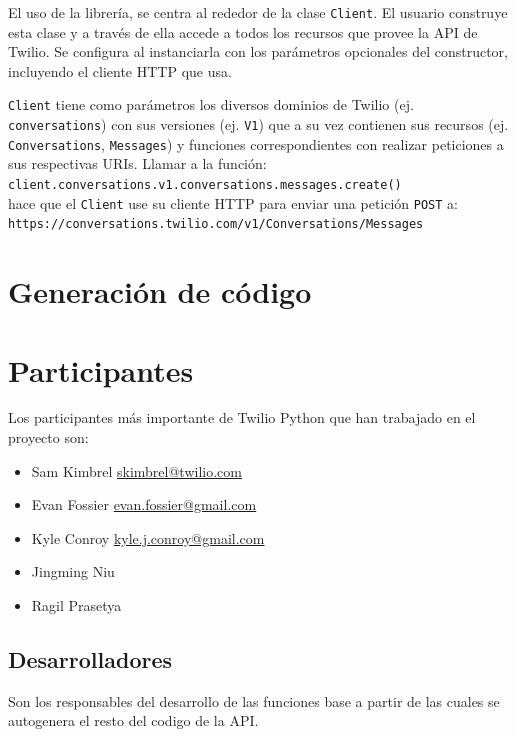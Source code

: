 \documentclass{article}
\begin{document}
\hfill

El uso de la librería, se centra al rededor de la clase \verb|Client|.
El usuario construye esta clase
y a través de ella accede a todos los recursos que provee la API de Twilio.
Se configura al instanciarla con los parámetros opcionales del constructor,
incluyendo el cliente HTTP que usa.

\verb|Client| tiene como parámetros los diversos dominios de Twilio
(ej. \verb|conversations|)
con sus versiones (ej. \verb|V1|)
que a su vez contienen sus recursos
(ej. \verb|Conversations|, \verb|Messages|)
y funciones correspondientes con realizar peticiones
a sus respectivas URIs.
Llamar a la función:
\\ \hspace*{1em} \verb|client.conversations.v1.conversations.messages.create()|
\\hace que el \verb|Client|
use su cliente HTTP para enviar una petición \verb|POST| a:
\\ \hspace*{1em} \verb|https://conversations.twilio.com/v1/Conversations/Messages|

\section{Generación de código}



\section{Participantes}
Los participantes más importante de Twilio Python que han trabajado en el proyecto son:
\begin{itemize}
  \item Sam Kimbrel \href{mailto:skimbrel@twilio.com}{skimbrel@twilio.com}
  \item Evan Fossier \href{mailto:evan.fossier@gmail.com}{evan.fossier@gmail.com}
  \item Kyle Conroy \href{mailto:kyle.j.conroy@gmail.com}{kyle.j.conroy@gmail.com}
  \item Jingming Niu 
  \item Ragil Prasetya 
  
  \end{itemize}
  
  \subsection*{Desarrolladores}
  Son los responsables del desarrollo de las funciones base a partir de las cuales se autogenera el resto del codigo de la API.
\end{document}
